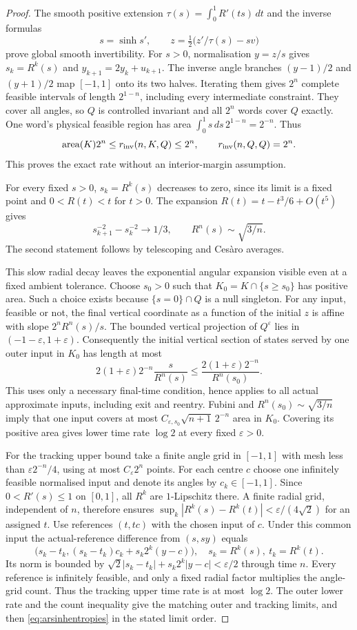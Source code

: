 \documentclass[11pt]{amsart}
\theoremstyle{definition}
\theoremstyle{remark}
\newcommand{\area}{\operatorname{area}}
\numberwithin{equation}{section}
\begin{document}
\begin{proof}
The smooth positive extension
$\tau(s)=\int_0^1R'(ts)\,dt$ and the inverse formulas
\[
s=\sinh s',\qquad z=\tfrac12\bigl(z'/\tau(s)-sv\bigr)
\]
prove global smooth invertibility. For $s>0$, normalisation
$y=z/s$ gives $s_k=R^k(s)$ and $y_{k+1}=2y_k+u_{k+1}$.
The inverse angle branches $(y-1)/2$ and $(y+1)/2$ map
$[-1,1]$ onto its two halves. Iterating them gives $2^n$
complete feasible intervals of length $2^{1-n}$, including
every intermediate constraint. They cover all angles, so $Q$
is controlled invariant and all $2^n$ words cover $Q$ exactly.
One word's physical feasible region has area
$\int_0^1s\,ds\,2^{1-n}=2^{-n}$. Thus
\[
\area(K)2^n\le r_{\rm inv}(n,K,Q)\le2^n,
\qquad r_{\rm inv}(n,Q,Q)=2^n.
\]
This proves the exact rate without an interior-margin assumption.

For every fixed $s>0$, $s_k=R^k(s)$ decreases to zero, since
its limit is a fixed point and $0<R(t)<t$ for $t>0$.
The expansion $R(t)=t-t^3/6+O(t^5)$ gives
\[
s_{k+1}^{-2}-s_k^{-2}\longrightarrow1/3,
\qquad R^n(s)\sim\sqrt{3/n}.
\]
The second statement follows by telescoping and Ces\`aro averages.

This slow radial decay leaves the exponential angular expansion
visible even at a fixed ambient tolerance. Choose $s_0>0$ such that
$K_0=K\cap\{s\ge s_0\}$ has
positive area. Such a choice exists because $\{s=0\}\cap Q$
is a null singleton. For any input, feasible or not, the final
vertical coordinate as a function of the initial $z$ is affine
with slope $2^nR^n(s)/s$. The bounded vertical projection
of $Q^\varepsilon$ lies in $(-1-\varepsilon,1+\varepsilon)$.
Consequently the initial vertical section of states served by one
outer input in $K_0$ has length at most
\[
2(1+\varepsilon)2^{-n}\frac{s}{R^n(s)}
 \le\frac{2(1+\varepsilon)2^{-n}}{R^n(s_0)}.
\]
This uses only a necessary final-time condition, hence applies to
all actual approximate inputs, including exit and reentry.
Fubini and $R^n(s_0)\sim\sqrt{3/n}$ imply that one input
covers at most $C_{\varepsilon,s_0}\sqrt{n+1}\,2^{-n}$
area in $K_0$. Covering its positive area gives lower time rate
$\log2$ at every fixed $\varepsilon>0$.

For the tracking upper bound take a finite angle grid in $[-1,1]$
with mesh less than $\varepsilon2^{-n}/4$, using at most
$C_\varepsilon2^n$ points. For each centre $c$ choose one
infinitely feasible normalised input and denote its angles by
$c_k\in[-1,1]$. Since $0<R'(s)\le1$ on $[0,1]$, all
$R^k$ are $1$-Lipschitz there. A finite radial grid, independent
of $n$, therefore ensures $\sup_k|R^k(s)-R^k(t)|<\varepsilon/(4\sqrt2)$
for an assigned $t$. Use references $(t,tc)$ with the chosen
input of $c$. Under this common input the actual-reference difference
from $(s,sy)$ equals
\[
\bigl(s_k-t_k,(s_k-t_k)c_k+s_k2^k(y-c)\bigr),
\quad s_k=R^k(s),\ t_k=R^k(t).
\]
Its norm is bounded by
$\sqrt2|s_k-t_k|+s_k2^k|y-c|<\varepsilon/2$ through time $n$.
Every reference is infinitely feasible, and only a fixed radial
factor multiplies the angle-grid count. Thus the tracking upper
time rate is at most $\log2$. The outer lower rate and the
count inequality give the matching outer and tracking limits,
and then \eqref{eq:arsinhentropies} in the stated limit order.


\end{proof}
\end{document}
